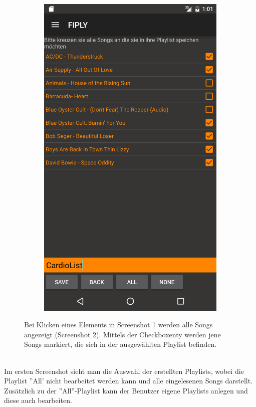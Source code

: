 \documentclass[FIPLY_base.tex]{subfiles}
\begin{document}
\begin{figure}[h]
\begin{subfigure}[b]{0.3\textwidth}
	\includegraphics[scale=0.15]{img/musicSongView1}
	\end{subfigure}
	\caption{Bei Klicken eines Elements in Screenshot 1 werden alle Songs angezeigt (Screenshot 2). 
	Mittels der Checkboxenty werden jene Songs markiert, die sich in der ausgewählten Playlist befinden.}
\end{figure}

\ \\
Im ersten Screenshot sieht man die Auswahl der erstellten Playlists, wobei die Playlist ''All' nicht bearbeitet werden kann und alle eingelesenen Songs darstellt.
Zusätzlich zu der ''All''-Playlist kann der Benutzer eigene Playlists anlegen und diese auch bearbeiten.
\end{document}
